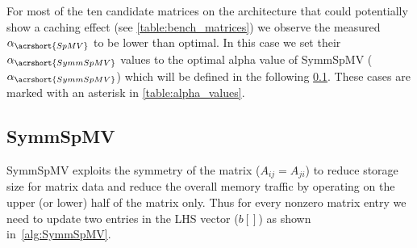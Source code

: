 For most of the ten candidate matrices on the \SKX architecture that could
potentially show a caching effect (see \cref{table:bench_matrices}) we
observe the measured $\alpha_{\acrshort{SpMV}}$ to be lower than
optimal. In this case we set their $\alpha_{\acrshort{SymmSpMV}}$ values to the optimal alpha value
of \acrshort{SymmSpMV} ($\alpha_{\acrshort{SymmSpMV}}$) which will be
defined in the following \cref{sect:SymmSpmv}. These cases are marked
with an asterisk in \cref{table:alpha_values}.
 
\begin{comment}
\subsubsection{\SpMTV}
Sparse Matrix Transpose Vector multiplication (\SpMTV) is a kernel with a \DTWO dependency.
\begin{algorithm}[H]
	\caption{SpMTV Find $b$ : $b=A'x$} 
	\label{alg:SpMTV}
	\begin{algorithmic}[1]
		\FOR{$row=1:nrows$}
		\FOR{$idx=rowPtr[row]:rowPtr[row+1]$}
		\STATE{$b[col[idx]] += A[idx]*x[row]$} 
		\ENDFOR
		\ENDFOR
	\end{algorithmic}
\end{algorithm}
In comparison to \acrshort{SpMV} it requires scattered writes, which require attention in order to avoid race conditions when executing in parallel. The arithmetic intensity of the kernel $I_\mathrm{\SpMTV}$ is
\begin{equation}
\label{eq:SpMTV_intensity}
I_\mathrm{\SpMTV} (\alpha)= \frac{2}{8+4+16\alpha+8/\acrshort{NNZR}} \\
\end{equation}
In ideal case data traffic for this kernel should remain close to that of SpMV, if \acrshort{NNZR} are sufficiently high, and $\alpha$ factor is small enough.
\end{comment}

\subsection{\acrshort{SymmSpMV}}
\label{sect:SymmSpmv}

\Acrshort{SymmSpMV} exploits the symmetry of the matrix ($A_{ij}=A_{ji}$)
to reduce storage size for matrix data and reduce the overall memory
traffic by operating on the upper (or lower) half of the matrix
only. Thus for every nonzero matrix entry we need to update two
entries in the LHS vector ($b[]$) as shown in~\cref{alg:SymmSpMV}.

